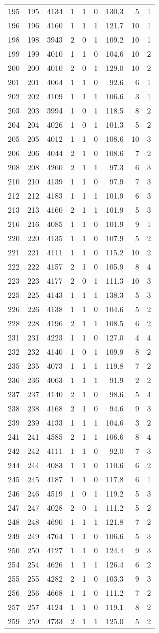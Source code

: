 \documentclass[]{article}
\begin{document}
\begin{longtable}[]{@{}lrrlrrrrr@{}}
195 & 195 & 4134 & 1 & 1 & 0 & 130.3 & 5 & 1\tabularnewline
196 & 196 & 4160 & 1 & 1 & 1 & 121.7 & 10 & 1\tabularnewline
198 & 198 & 3943 & 2 & 0 & 1 & 109.2 & 10 & 1\tabularnewline
199 & 199 & 4010 & 1 & 1 & 0 & 104.6 & 10 & 2\tabularnewline
200 & 200 & 4010 & 2 & 0 & 1 & 129.0 & 10 & 2\tabularnewline
201 & 201 & 4064 & 1 & 1 & 0 & 92.6 & 6 & 1\tabularnewline
202 & 202 & 4109 & 1 & 1 & 1 & 106.6 & 3 & 1\tabularnewline
203 & 203 & 3994 & 1 & 0 & 1 & 118.5 & 8 & 2\tabularnewline
204 & 204 & 4026 & 1 & 0 & 1 & 101.3 & 5 & 2\tabularnewline
205 & 205 & 4012 & 1 & 1 & 0 & 108.6 & 10 & 3\tabularnewline
206 & 206 & 4044 & 2 & 1 & 0 & 108.6 & 7 & 2\tabularnewline
208 & 208 & 4260 & 2 & 1 & 1 & 97.3 & 6 & 3\tabularnewline
210 & 210 & 4139 & 1 & 1 & 0 & 97.9 & 7 & 3\tabularnewline
212 & 212 & 4183 & 1 & 1 & 1 & 101.9 & 6 & 3\tabularnewline
213 & 213 & 4160 & 2 & 1 & 1 & 101.9 & 5 & 3\tabularnewline
216 & 216 & 4085 & 1 & 1 & 0 & 101.9 & 9 & 1\tabularnewline
220 & 220 & 4135 & 1 & 1 & 0 & 107.9 & 5 & 2\tabularnewline
221 & 221 & 4111 & 1 & 1 & 0 & 115.2 & 10 & 2\tabularnewline
222 & 222 & 4157 & 2 & 1 & 0 & 105.9 & 8 & 4\tabularnewline
223 & 223 & 4177 & 2 & 0 & 1 & 111.3 & 10 & 3\tabularnewline
225 & 225 & 4143 & 1 & 1 & 1 & 138.3 & 5 & 3\tabularnewline
226 & 226 & 4138 & 1 & 1 & 0 & 104.6 & 5 & 2\tabularnewline
228 & 228 & 4196 & 2 & 1 & 1 & 108.5 & 6 & 2\tabularnewline
231 & 231 & 4223 & 1 & 1 & 0 & 127.0 & 4 & 4\tabularnewline
232 & 232 & 4140 & 1 & 0 & 1 & 109.9 & 8 & 2\tabularnewline
235 & 235 & 4073 & 1 & 1 & 1 & 119.8 & 7 & 2\tabularnewline
236 & 236 & 4063 & 1 & 1 & 1 & 91.9 & 2 & 2\tabularnewline
237 & 237 & 4140 & 2 & 1 & 0 & 98.6 & 5 & 4\tabularnewline
238 & 238 & 4168 & 2 & 1 & 0 & 94.6 & 9 & 3\tabularnewline
239 & 239 & 4133 & 1 & 1 & 1 & 104.6 & 3 & 2\tabularnewline
241 & 241 & 4585 & 2 & 1 & 1 & 106.6 & 8 & 4\tabularnewline
242 & 242 & 4111 & 1 & 1 & 0 & 92.0 & 7 & 3\tabularnewline
244 & 244 & 4083 & 1 & 1 & 0 & 110.6 & 6 & 2\tabularnewline
245 & 245 & 4187 & 1 & 1 & 0 & 117.8 & 6 & 1\tabularnewline
246 & 246 & 4519 & 1 & 0 & 1 & 119.2 & 5 & 3\tabularnewline
247 & 247 & 4028 & 2 & 0 & 1 & 111.2 & 5 & 2\tabularnewline
248 & 248 & 4690 & 1 & 1 & 1 & 121.8 & 7 & 2\tabularnewline
249 & 249 & 4764 & 1 & 1 & 0 & 106.6 & 5 & 3\tabularnewline
250 & 250 & 4127 & 1 & 1 & 0 & 124.4 & 9 & 3\tabularnewline
254 & 254 & 4626 & 1 & 1 & 1 & 126.4 & 6 & 2\tabularnewline
255 & 255 & 4282 & 2 & 1 & 0 & 103.3 & 9 & 3\tabularnewline
256 & 256 & 4668 & 1 & 1 & 0 & 111.2 & 7 & 2\tabularnewline
257 & 257 & 4124 & 1 & 1 & 0 & 119.1 & 8 & 2\tabularnewline
259 & 259 & 4733 & 2 & 1 & 1 & 125.0 & 5 & 2\tabularnewline

\end{longtable}
\end{document}
